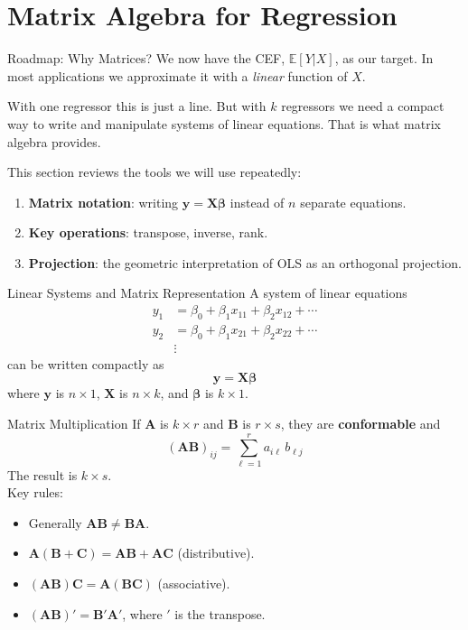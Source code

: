 \documentclass[aspectratio=169, handout, t]{beamer}
\numberwithin{equation}{section}
\begin{document}
\section[Matrices]{Matrix Algebra for Regression}


\begin{frame}{Roadmap: Why Matrices?}
We now have the CEF, $\mathbb{E}[Y|X]$, as our target. In most applications we approximate it with a \emph{linear} function of $X$.\pause

\vspace{0.3cm}

With one regressor this is just a line. But with $k$ regressors we need a compact way to write and manipulate systems of linear equations. That is what matrix algebra provides.\pause

\vspace{0.3cm}

This section reviews the tools we will use repeatedly:
\begin{enumerate}
\item \textbf{Matrix notation}: writing $\bm{y}=\bm{X}\bm{\beta}$ instead of $n$ separate equations.
\item \textbf{Key operations}: transpose, inverse, rank.
\item \textbf{Projection}: the geometric interpretation of OLS as an orthogonal projection.
\end{enumerate}
\end{frame}


\begin{frame}{Linear Systems and Matrix Representation}
A system of linear equations
\begin{align*}
y_1&=\beta_0+\beta_1 x_{11}+\beta_2 x_{12}+\cdots\\
y_2&=\beta_0+\beta_1 x_{21}+\beta_2 x_{22}+\cdots\\
&\vdots
\end{align*}
can be written compactly as
$$\bm{y}=\bm{X}\bm{\beta}$$
where $\bm{y}$ is $n\times 1$, $\bm{X}$ is $n\times k$, and $\bm{\beta}$ is $k\times 1$.
\end{frame}

\begin{frame}{Matrix Multiplication}
If $\bm{A}$ is $k\times r$ and $\bm{B}$ is $r \times s$, they are \textbf{conformable} and
$$(\bm{AB})_{ij}=\sum_{\ell=1}^r a_{i\ell}\, b_{\ell j}$$
The result is $k \times s$.\\
\bigskip
Key rules:
\begin{itemize}
\item Generally $\bm{AB}\neq \bm{BA}$.\pause
\item $\bm{A}(\bm{B}+\bm{C})=\bm{AB}+\bm{AC}$ \quad (distributive).
\item $(\bm{AB})\bm{C}=\bm{A}(\bm{BC})$ \quad (associative).\pause
\item $(\bm{AB})'=\bm{B}'\bm{A}'$, where $'$ is the transpose.
\end{itemize}
\end{frame}
\end{document}
